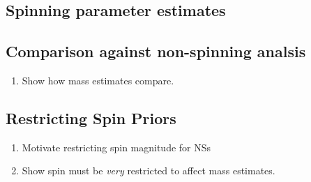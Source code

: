 \subsection{Spinning parameter estimates}


\subsection{Comparison against non-spinning analsis}

\begin{enumerate}
\item Show how mass estimates compare.
\end{enumerate}


\subsection{Restricting Spin Priors}

\begin{enumerate}
\item Motivate restricting spin magnitude for NSs
\item Show spin must be \textit{very} restricted to affect mass estimates.
\end{enumerate}